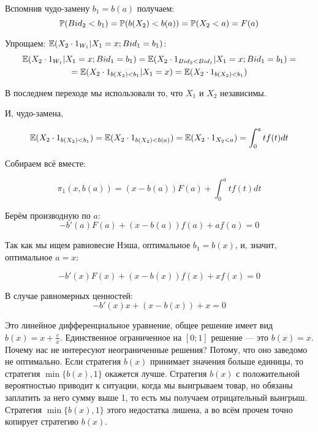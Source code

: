 \begin{myex}
Вспомнив чудо-замену $ b_{1}=b(a) $ получаем:
\begin{equation}
\P(Bid_{2}<b_{1})=\P(b(X_{2})<b(a))=\P(X_{2}<a)=F(a)
\end{equation}

Упрощаем: $ \E(X_{2}\cdot 1_{W_{1}}|X_{1}=x; Bid_{1}=b_{1}) $:
\begin{multline}
\E(X_{2}\cdot 1_{W_{1}}|X_{1}=x; Bid_{1}=b_{1})=\E(X_{2}\cdot 1_{Bid_{2}<Bid_{1}}|X_{1}=x; Bid_{1}=b_{1})=\\
=\E(X_{2}\cdot 1_{b(X_{2})<b_{1}}|X_{1}=x)=\E(X_{2}\cdot 1_{b(X_{2})<b_{1}})
\end{multline}

В последнем переходе мы использовали то, что $ X_{1} $ и $ X_{2} $ независимы.

И, чудо-замена,

\begin{equation}
\E(X_{2}\cdot 1_{b(X_{2})<b_{1}})=\E(X_{2}\cdot 1_{b(X_{2})<b(a)})=\E(X_{2}\cdot 1_{X_{2}<a})=\int_{0}^{a}tf(t)dt
\end{equation}

Собираем всё вместе:

\begin{equation}
\pi_{1}(x,b(a))=(x-b(a))F(a)+\int_{0}^{a}tf(t)dt
\end{equation}

Берём производную по $ a $:
\begin{equation}
-b'(a)F(a)+(x-b(a))f(a)+af(a)=0
\end{equation}

Так как мы ищем равновесие Нэша, оптимальное $b_{1}=b(x)$, и, значит, оптимальное $ a=x $:

\begin{equation}
-b'(x)F(x)+(x-b(x))f(x)+xf(x)=0
\end{equation}

В случае равномерных ценностей:
\begin{equation}
-b'(x)x+(x-b(x))+x=0
\end{equation}

Это линейное дифференциальное уравнение, общее решение имеет вид $ b(x)=x+\frac{c}{x} $. Единственное ограниченное на $ [0;1] $ решение — это $ b(x)=x $. Почему нас не интересуют неограниченные решения? Потому, что оно заведомо не оптимально. Если стратегия $ b(x) $ принимает значения больше единицы, то стратегия $ \min\{b(x),1\} $ окажется лучше. Стратегия $b(x)$ с положительной вероятностью приводит к ситуации, когда мы выигрываем товар, но обязаны заплатить за него сумму выше 1, то есть мы получаем отрицательный выигрыш. Стратегия $\min\{b(x), 1\}$ этого недостатка лишена, а во всём прочем точно копирует стратегию $b(x)$.

\end{myex}


